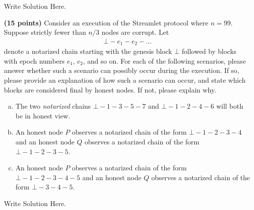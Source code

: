 \documentclass[12pt]{hw}
\begin{document}
\begin{answer} 
Write Solution Here.
\end{answer}



\begin{exercise}
{\bf (15 points)}    
Consider an execution of the Streamlet protocol where $n = 99$. Suppose strictly fewer than $n / 3$ nodes are corrupt. 
Let 
\begin{align*}
    \bot - e_1 - e_2 - \ldots
\end{align*}
denote a notarized chain starting with the genesis block $\bot$ followed by blocks 
with epoch numbers $e_1$, $e_2$, and so on.
For each of the following scenarios, please answer whether such a scenario can possibly occur during the execution. If so, please provide an explanation of how such a scenario can occur, and state which blocks are considered final by honest nodes. If not, please explain why. 
\begin{enumerate}[(a)]
    \item The two \emph{notarized} chains $\bot - 1 - 3 - 5 - 7$ and $\bot - 1 - 2 - 4 - 6$ will both be in honest view.

    \item An honest node $P$ observes a notarized chain of the form $\bot - 1 - 2 - 3 - 4$ and an honest node $Q$ observes a notarized chain of the form $\bot - 1 - 2 - 3 - 5$.

    \item An honest node $P$ observes a notarized chain of the form $\bot - 1 - 2 - 3 - 4 - 5$ and an honest node $Q$ observes a notarized chain of the form $\bot - 3 - 4 - 5$.
\end{enumerate}
\end{exercise}
\begin{answer}
Write Solution Here.
\end{answer}

\end{document}
